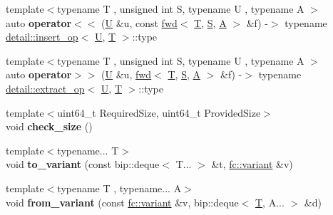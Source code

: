 \begin{DoxyCompactItemize}
\item 
\mbox{\label{namespacefc_a77d311915918f07a27b2f90fc95fc61a}} 
{\footnotesize template$<$typename T , unsigned int S, typename U , typename A $>$ }\\auto {\bfseries operator$<$$<$} (\mbox{\hyperlink{union_u}{U}} \&u, const \mbox{\hyperlink{classfc_1_1fwd}{fwd}}$<$ \mbox{\hyperlink{struct_t}{T}}, \mbox{\hyperlink{struct_s}{S}}, \mbox{\hyperlink{struct_a}{A}} $>$ \&f) -\/$>$ typename \mbox{\hyperlink{structfc_1_1detail_1_1insert__op}{detail\+::insert\+\_\+op}}$<$ \mbox{\hyperlink{union_u}{U}}, \mbox{\hyperlink{struct_t}{T}} $>$\+::type
\item 
\mbox{\label{namespacefc_a9607b0bf485e8d787f5ad99655e07dd1}} 
{\footnotesize template$<$typename T , unsigned int S, typename U , typename A $>$ }\\auto {\bfseries operator$>$$>$} (\mbox{\hyperlink{union_u}{U}} \&u, \mbox{\hyperlink{classfc_1_1fwd}{fwd}}$<$ \mbox{\hyperlink{struct_t}{T}}, \mbox{\hyperlink{struct_s}{S}}, \mbox{\hyperlink{struct_a}{A}} $>$ \&f) -\/$>$ typename \mbox{\hyperlink{structfc_1_1detail_1_1extract__op}{detail\+::extract\+\_\+op}}$<$ \mbox{\hyperlink{union_u}{U}}, \mbox{\hyperlink{struct_t}{T}} $>$\+::type
\item 
\mbox{\label{namespacefc_a38801b38281743a0d544ad21d0a4aaba}} 
{\footnotesize template$<$uint64\+\_\+t Required\+Size, uint64\+\_\+t Provided\+Size$>$ }\\void {\bfseries check\+\_\+size} ()
\item 
\mbox{\label{namespacefc_a564fff5f2968187064153391940c4393}} 
{\footnotesize template$<$typename... T$>$ }\\void {\bfseries to\+\_\+variant} (const bip\+::deque$<$ T... $>$ \&t, \mbox{\hyperlink{classfc_1_1variant}{fc\+::variant}} \&v)
\item 
\mbox{\label{namespacefc_afc441722de6ef07b485ae4079b55aec5}} 
{\footnotesize template$<$typename T , typename... A$>$ }\\void {\bfseries from\+\_\+variant} (const \mbox{\hyperlink{classfc_1_1variant}{fc\+::variant}} \&v, bip\+::deque$<$ \mbox{\hyperlink{struct_t}{T}}, A... $>$ \&d)
\item 
\mbox{\label{namespacefc_a67aba2b231120b651a42e2474a978a56}} 

\end{DoxyCompactItemize}
